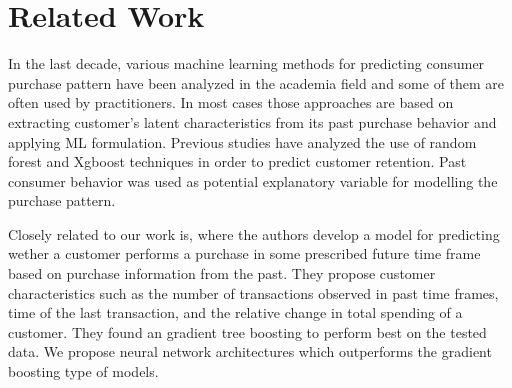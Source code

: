\section{Related Work}
In the last decade, various machine learning methods for predicting consumer purchase pattern have been analyzed in
the academia field and some of them are often used by practitioners. In most cases those approaches are based on extracting 
customer’s latent characteristics from its past purchase behavior and applying ML formulation. 
Previous studies have analyzed the use of random forest and Xgboost techniques in order to predict 
customer retention. Past consumer behavior was used as potential explanatory variable 
for modelling the purchase pattern. 

Closely related to our work is, where the authors develop a model for predicting wether a customer performs a 
purchase in some prescribed future time frame based on purchase information from the past. 
They propose customer characteristics such as the number of transactions observed in past time frames, 
time of the last transaction, and the relative change
in total spending of a customer. They found an gradient tree boosting to perform best on the
tested data. We propose neural network architectures which outperforms the gradient boosting type of models.
